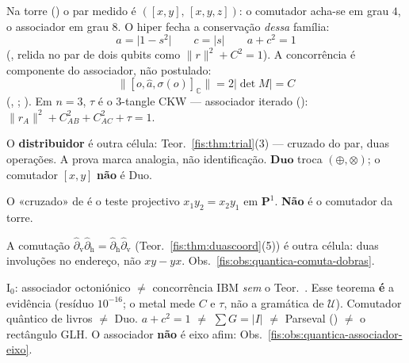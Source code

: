 \documentclass[livro.tex]{subfiles}
\begin{document}
\begin{observacao}[dual do associador $=$ comutador, não o distribuidor]\label{fis:obs:quantica-triade}
Na torre () o par medido é
\(([x,y],\,[x,y,z])\): o comutador acha-se em grau \(4\), o
associador em grau \(8\). O hiper fecha a conservação
\emph{dessa} família:
\[
\boxed{\;
a=\lvert 1-s^{2}\rvert
\qquad
c=\lvert s\rvert
\qquad
a+c^{2}=1
\;}
\]
(, relida no par de dois
qubits como \(\lVert r\rVert^{2}+C^{2}=1\)). A concorrência é
componente do associador, não postulado:
\[
\boxed{\;
\bigl\lVert[o,\hat a,\sigma(o)]_{\mathbb{C}}\bigr\rVert
=2\lvert\det M\rvert=C
\;}
\]
(, ;
). Em \(n=3\),
\(\tau\) é o 3-tangle CKW --- associador iterado
():
\(\lVert r_{A}\rVert^{2}+C_{AB}^{2}+C_{AC}^{2}+\tau=1\).

O \textbf{distribuidor} é outra célula: Teor.~\ref{fis:thm:trial}(3)
--- cruzado do par, duas operações. A prova marca analogia, não
identificação. \(\mathbf{Duo}\) troca \((\oplus,\otimes)\); o
comutador \([x,y]\) \textbf{não} é Duo.

O «cruzado» de  é o teste projectivo
\(x_{1}y_{2}=x_{2}y_{1}\) em \(\mathbf{P}^{1}\). \textbf{Não} é o
comutador da torre.

A comutação
\(\hat\partial_{\mathrm{v}}\hat\partial_{\mathrm{h}}
=\hat\partial_{\mathrm{h}}\hat\partial_{\mathrm{v}}\)
(Teor.~\ref{fis:thm:duascoord}(5))
é outra célula: duas involuções no endereço,
não \(xy-yx\).
Obs.~\ref{fis:obs:quantica-comuta-dobras}.

\(\mathrm{I}_{0}\): associador octoniónico \(\neq\) concorrência IBM
\emph{sem} o Teor.~. Esse teorema
\textbf{é} a evidência (resíduo \(10^{-16}\); o metal mede \(C\) e
\(\tau\), não a gramática de \(\mathcal{U}\)). Comutador quântico
de livros \(\neq\) Duo. \(a+c^{2}=1\) \(\neq\)
\(\sum G=\lvert I\rvert\) \(\neq\) Parseval
() \(\neq\) o rectângulo GLH.
O associador \textbf{não} é eixo afim: Obs.~\ref{fis:obs:quantica-associador-eixo}.
\end{observacao}
\end{document}

